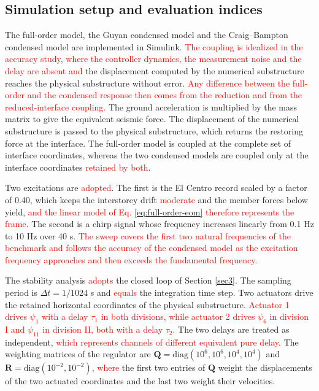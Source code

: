 \documentclass[11pt,a4paper]{article}
\numberwithin{equation}{section}
\newcommand{\rev}[1]{\textcolor{red}{#1}}
\begin{document}
\subsection{Simulation setup and evaluation indices}
\label{sec:setup}

The full-order model, the Guyan condensed model and the Craig--Bampton condensed model are implemented in Simulink. \rev{The coupling is idealized in the accuracy study, where the controller dynamics, the measurement noise and the delay are absent and} the displacement computed by the numerical substructure reaches the physical substructure without error. \rev{Any difference between the full-order and the condensed response then comes from the reduction and from the reduced-interface coupling.} The ground acceleration is multiplied by the mass matrix to give the equivalent seismic force. The displacement of the numerical substructure is passed to the physical substructure, which returns the restoring force at the interface. The full-order model is coupled at the complete set of interface coordinates, whereas the two condensed models are coupled only at the interface coordinates \rev{retained by both}.

Two excitations are \rev{adopted}. The first is the El Centro record scaled by a factor of 0.40, which keeps the interstorey drift \rev{moderate} and the member forces below yield, \rev{and the linear model of Eq. \eqref{eq:full-order-eom} therefore represents the frame}. The second is a chirp signal whose frequency increases linearly from 0.1 Hz to 10 Hz over 40 s. \rev{The sweep covers the first two natural frequencies of the benchmark and follows the accuracy of the condensed model as the excitation frequency approaches and then exceeds the fundamental frequency.}

The stability analysis \rev{adopts} the closed loop of Section \ref{sec3}. The sampling period is \(\Delta t=1/1024\) s and \rev{equals} the integration time step. Two actuators drive the retained horizontal coordinates of the physical substructure. \rev{Actuator 1 drives \(\psi_{1}\) with a delay \(\tau_{1}\) in both divisions, while actuator 2 drives \(\psi_{6}\) in division I and \(\psi_{11}\) in division II, both with a delay \(\tau_{2}\).} The two delays are treated as independent, \rev{which represents channels of different equivalent pure delay}. The weighting matrices of the regulator are \(\mathbf{Q}=\mathrm{diag}(10^{6},10^{6},10^{4},10^{4})\) and \(\mathbf{R}=\mathrm{diag}(10^{-2},10^{-2})\), \rev{where} the first two entries of \(\mathbf{Q}\) weight the displacements of the two actuated coordinates and the last two weight their velocities.
\end{document}
